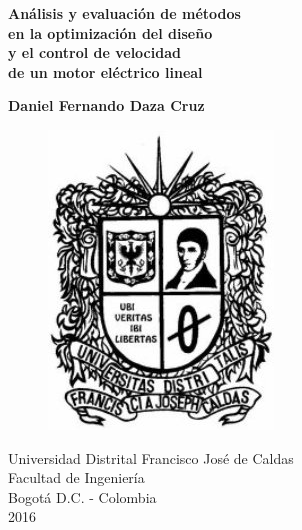 \begin{titlepage}

\begin{center}

\begin{Large}
\textbf{Análisis y evaluación de métodos\\en la optimización del diseño\\y el control de velocidad\\de un motor eléctrico lineal} \\
\end{Large}
\vspace*{1in}
\begin{large}
\textbf{Daniel Fernando Daza Cruz}\\
\end{large}
\vspace*{3in}

\begin{figure}[htb]
\begin{center}
\includegraphics[scale=0.4]{logo}
\end{center}
\end{figure}
Universidad Distrital Francisco José de Caldas\\
Facultad de Ingeniería\\
Bogotá D.C. - Colombia\\
2016
\end{center}
\end{titlepage}

